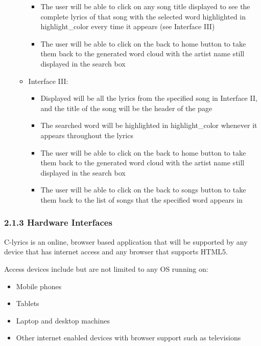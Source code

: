 \documentclass[]{article}
\begin{document}
\begin{itemize}
\begin{itemize}
    \begin{itemize}
    \itemsep1pt\parskip0pt
    \item
      The user will be able to click on any song title displayed to see
      the complete lyrics of that song with the selected word
      highlighted in highlight\_color every time it appears (see
      Interface III)
    \item
      The user will be able to click on the back to home button to take
      them back to the generated word cloud with the artist name still
      displayed in the search box
    \end{itemize}
  \item
    Interface III:

    \begin{itemize}
    \itemsep1pt\parskip0pt
    \item
      Displayed will be all the lyrics from the specified song in
      Interface II, and the title of the song will be the header of the
      page
    \item
      The searched word will be highlighted in highlight\_color whenever
      it appears throughout the lyrics
    \item
      The user will be able to click on the back to home button to take
      them back to the generated word cloud with the artist name still
      displayed in the search box
    \item
      The user will be able to click on the back to songs button to take
      them back to the list of songs that the specified word appears in
    \end{itemize}
  \end{itemize}
\end{itemize}

\subsubsection{2.1.3 Hardware Interfaces}\label{hardware-interfaces}

C-lyrics is an online, browser based application that will be supported
by any device that has internet access and any browser that supports
HTML5.

Access devices include but are not limited to any OS running on:

\begin{itemize}
\itemsep1pt\parskip0pt
\item
  Mobile phones
\item
  Tablets
\item
  Laptop and desktop machines
\item
  Other internet enabled devices with browser support such as
  televisions
\end{itemize}
\end{document}
